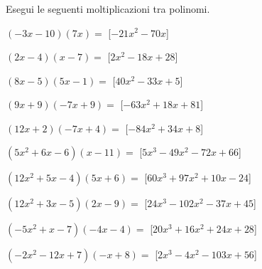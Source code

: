 \subsubsection*{}

\begin{esercizio}
\label{ese:10.20}
Esegui le seguenti moltiplicazioni tra polinomi.
\begin{enumeratea}
\spazielenx
\item \(\left(- 3 x - 10\right)\left(7 x\right)=\)
  \hfill [\(- 21 x^{2} - 70 x\)]
\item \(\left(2 x - 4\right)\left(x - 7\right)=\)
  \hfill [\(2 x^{2} - 18 x + 28\)]
\item \(\left(8 x - 5\right)\left(5 x - 1\right)=\)
  \hfill [\(40 x^{2} - 33 x + 5\)]
\item \(\left(9 x + 9\right)\left(- 7 x + 9\right)=\)
  \hfill [\(- 63 x^{2} + 18 x + 81\)]
\item \(\left(12 x + 2\right)\left(- 7 x + 4\right)=\)
  \hfill [\(- 84 x^{2} + 34 x + 8\)]
\item \(\left(5 x^{2} + 6 x - 6\right)\left(x - 11\right)=\)
  \hfill [\(5 x^{3} - 49 x^{2} - 72 x + 66\)]
\item \(\left(12 x^{2} + 5 x - 4\right)\left(5 x + 6\right)=\)
  \hfill [\(60 x^{3} + 97 x^{2} + 10 x - 24\)]
\item \(\left(12 x^{2} + 3 x - 5\right)\left(2 x - 9\right)=\)
  \hfill [\(24 x^{3} - 102 x^{2} - 37 x + 45\)]
\item \(\left(- 5 x^{2} + x - 7\right)\left(- 4 x - 4\right)=\)
  \hfill [\(20 x^{3} + 16 x^{2} + 24 x + 28\)]
\item \(\left(- 2 x^{2} - 12 x + 7\right)\left(- x + 8\right)=\)
  \hfill [\(2 x^{3} - 4 x^{2} - 103 x + 56\)]

\end{enumeratea}
\end{esercizio}
